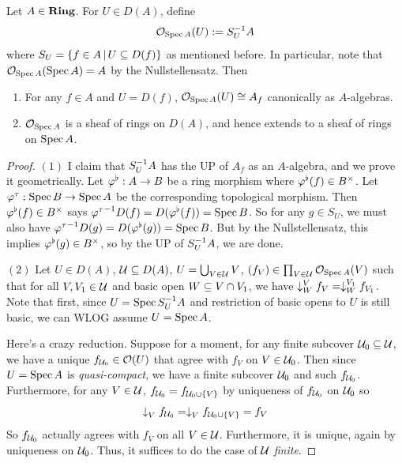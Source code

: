 \begin{prop}
  
  Let $A \in \mathbf{Ring}$.
  For $U \in D(A)$, 
  define \[
    \mathcal{O}_{\operatorname{Spec} A}(U) := S_U^{-1} A
  \]
  where $S_U = \left\{f \in A \,|\, U \subseteq D(f)\right\}$ as mentioned before. 
  In particular, note that $\mathcal{O}_{\operatorname{Spec} A}(\operatorname{Spec} A) = A$ by the Nullstellensatz.
  Then
  \begin{enumerate}
    \item For any $f \in A$ and $U = D(f)$,
    $\mathcal{O}_{\operatorname{Spec} A}(U) \cong A_f$ canonically as $A$-algebras. 
    \item $\mathcal{O}_{\operatorname{Spec} A}$ is a sheaf of rings on $D(A)$,
    and hence extends to a sheaf of rings on $\operatorname{Spec} A$.
  \end{enumerate} 
\end{prop}
\begin{proof}
  $(1)$
  I claim that $S_U^{-1} A$ has the UP of $A_f$ as an $A$-algebra,
  and we prove it geometrically. 
  Let $\varphi^\flat : A \to B$ be a ring morphism where 
  $\varphi^\flat(f) \in B^\times$.
  Let $\varphi^\tau : \operatorname{Spec} B \to \operatorname{Spec} A$ be 
  the corresponding topological morphism.
  Then $\varphi^\flat(f) \in B^\times$ says 
  ${\varphi^\tau}^{-1} D(f) = D(\varphi^\flat(f)) = \operatorname{Spec} B$. 
  So for any $g \in S_U$, 
  we must also have ${\varphi^\tau}^{-1} D(g) = D(\varphi^\flat(g)) = \operatorname{Spec} B$.
  But by the Nullstellensatz, this implies $\varphi^\flat(g) \in B^\times$,
  so by the UP of $S_U^{-1} A$, we are done. 

  $(2)$
  Let $U \in D(A)$, $\mathcal{U} \subseteq D(A)$, $U = \bigcup_{V \in \mathcal{U}} V$,
  $(f_V) \in \prod_{V \in \mathcal{U}} \mathcal{O}_{\operatorname{Spec} A}(V)$ such that 
  for all $V, V_1 \in \mathcal{U}$ and basic open $W \subseteq V \cap V_1$,
  we have $\downarrow_{W}^{V}f_V = \downarrow_{W}^{V_1} f_{V_1}$.
  Note that first, since $U = \operatorname{Spec} S_U^{-1} A$ and 
  restriction of basic opens to $U$ is still basic,
  we can WLOG assume $U = \operatorname{Spec} A$. 

  Here's a crazy reduction. 
  Suppose for a moment, 
  for any finite subcover $\mathcal{U}_0 \subseteq \mathcal{U}$,
  we have a unique $f_{\mathcal{U}_0} \in \mathcal{O}(U)$ that 
  agree with $f_V$ on $V \in \mathcal{U}_0$.
  Then since $U = \operatorname{Spec} A$ is \emph{quasi-compact},
  we have a finite subcover $\mathcal{U}_0$ and such $f_{\mathcal{U}_0}$.
  Furthermore, 
  for any $V \in \mathcal{U}$, $f_{\mathcal{U}_0} = f_{\mathcal{U}_0 \cup \left\{V\right\}}$ by 
  uniqueness of $f_{\mathcal{U}_0}$ on $\mathcal{U}_0$ so
  \[
    \downarrow_{V}^{} f_{\mathcal{U}_0} = \downarrow_{V}^{} f_{\mathcal{U}_0 \cup \left\{V\right\}} = f_V
  \]
  So $f_{\mathcal{U}_0}$ actually agrees with $f_V$ on all $V \in \mathcal{U}$.
  Furthermore, it is unique, again by uniqueness on $\mathcal{U}_0$.
  Thus, it suffices to do the case of \emph{$\mathcal{U}$ finite}.



\end{proof}
